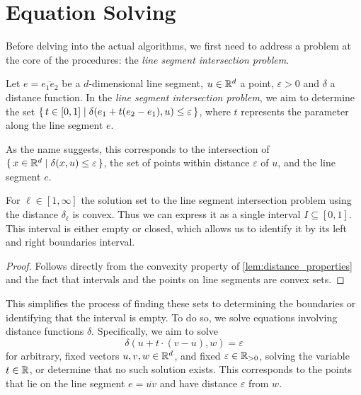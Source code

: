 \section{Equation Solving}
\label{subsec:equation_solving}
Before delving into the actual algorithms, we first need to address a problem at the core of the procedures: the \emph{line segment intersection problem}. 
\begin{definition}
  Let \(e = \overline{e_1e_2}\) be a \(d\)-dimensional line segment, \(u \in \mathbb{R}^d\) a point, \(\varepsilon > 0\) and \(\delta\) a distance function. In the \emph{line segment intersection problem}, we aim to determine the set \(\set{t \in [0, 1] \mid \delta(e_1 + t(e_2 - e_1), u) \leq \varepsilon}\), where \(t\) represents the parameter along the line segment \(e\).

  As the name suggests, this corresponds to the intersection of \(\set{x \in \mathbb{R}^d \mid \delta(x, u) \leq \varepsilon}\), the set of points within distance \(\varepsilon\) of \(u\), and the line segment \(e\). 
\end{definition}

\begin{observation}
  For \(\ell \in [1, \infty]\) the solution set to the line segment intersection problem using the distance \(\delta_\ell\) is convex. Thus we can express it as a single interval \(I \subseteq [0, 1]\). This interval is either empty or closed, which allows us to identify it by its left and right boundaries interval. 
\end{observation}
\begin{proof}
  Follows directly from the convexity property of \cref{lem:distance_properties} and the fact that intervals and the points on line segments are convex sets. 
\end{proof}

This simplifies the process of finding these sets to determining the boundaries or identifying that the interval is empty. To do so, we solve equations involving distance functions \(\delta\). Specifically, we aim to solve 
\begin{equation}
  \delta(u + t \cdot (v - u), w) = \varepsilon \label{eq:eq_solve_main}
\end{equation}
for arbitrary, fixed vectors \(u, v, w \in \mathbb{R}^d\), and fixed \(\varepsilon \in \mathbb{R}_{>0}\), solving the variable \(t \in \mathbb{R}\), or determine that no such solution exists. This corresponds to the points that lie on the line segment \(e = \overline{uv}\) and have distance \(\varepsilon\) from \(w\).

